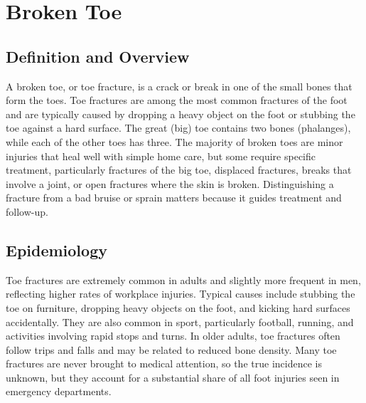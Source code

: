 \chapter{Broken Toe}

\section*{Definition and Overview}
A broken toe, or toe fracture, is a crack or break in one of the small bones that form the toes. Toe fractures are among the most common fractures of the foot and are typically caused by dropping a heavy object on the foot or stubbing the toe against a hard surface. The great (big) toe contains two bones (phalanges), while each of the other toes has three. The majority of broken toes are minor injuries that heal well with simple home care, but some require specific treatment, particularly fractures of the big toe, displaced fractures, breaks that involve a joint, or open fractures where the skin is broken. Distinguishing a fracture from a bad bruise or sprain matters because it guides treatment and follow-up.

\section*{Epidemiology}
Toe fractures are extremely common in adults and slightly more frequent in men, reflecting higher rates of workplace injuries. Typical causes include stubbing the toe on furniture, dropping heavy objects on the foot, and kicking hard surfaces accidentally. They are also common in sport, particularly football, running, and activities involving rapid stops and turns. In older adults, toe fractures often follow trips and falls and may be related to reduced bone density. Many toe fractures are never brought to medical attention, so the true incidence is unknown, but they account for a substantial share of all foot injuries seen in emergency departments.

